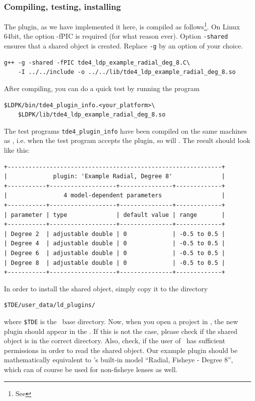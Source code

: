 \documentclass[10pt,a4paper]{article}
\begin{document}
\subsubsection{Compiling, testing, installing}
The plugin, as we have implemented it here, is compiled as follows\footnote{See }.
On Linux 64bit, the option -fPIC is required (for what reason ever). Option {\tt -shared} ensures
that a shared object is created. Replace {\tt-g} by an option of your choice.
\begin{verbatim}
g++ -g -shared -fPIC tde4_ldp_example_radial_deg_8.C\
    -I ../../include -o ../../lib/tde4_ldp_example_radial_deg_8.so
\end{verbatim}
After compiling, you can do a quick test by running the program
\begin{verbatim}
$LDPK/bin/tde4_plugin_info.<your_platform>\
    $LDPK/lib/tde4_ldp_example_radial_deg_8.so
\end{verbatim}
The test programs {\tt tde4\_plugin\_info} have been compiled on the same
machines as \tde, i.e. when the test program accepts the plugin, so will \tde.
The result should look like this:
\begin{verbatim}
+-------------------------------------------------------------+
|             plugin: 'Example Radial, Degree 8'              |
+-----------+-------------------+---------------+-------------+
|                4 model-dependent parameters                 |
+-----------+-------------------+---------------+-------------+
| parameter | type              | default value | range       |
+-----------+-------------------+---------------+-------------+
| Degree 2  | adjustable double | 0             | -0.5 to 0.5 |
| Degree 4  | adjustable double | 0             | -0.5 to 0.5 |
| Degree 6  | adjustable double | 0             | -0.5 to 0.5 |
| Degree 8  | adjustable double | 0             | -0.5 to 0.5 |
+-----------+-------------------+---------------+-------------+
\end{verbatim}
In order to install the shared object, simply copy it to the directory
\begin{verbatim}
$TDE/user_data/ld_plugins/
\end{verbatim}
where {\tt\$TDE} is the \tde\ base directory. Now, when you open a project in \tde,
the new plugin should appear in the . If this is not the case, please
check if the shared object is in the correct directory. Also, check, if the user
of \tde\ has sufficient permissions in order to read the shared object.
Our example plugin should be mathematically equivalent to \tde's built-in model
``Radial, Fisheye - Degree 8'', which can of course be used for non-fisheye lenses as well.
\end{document}
